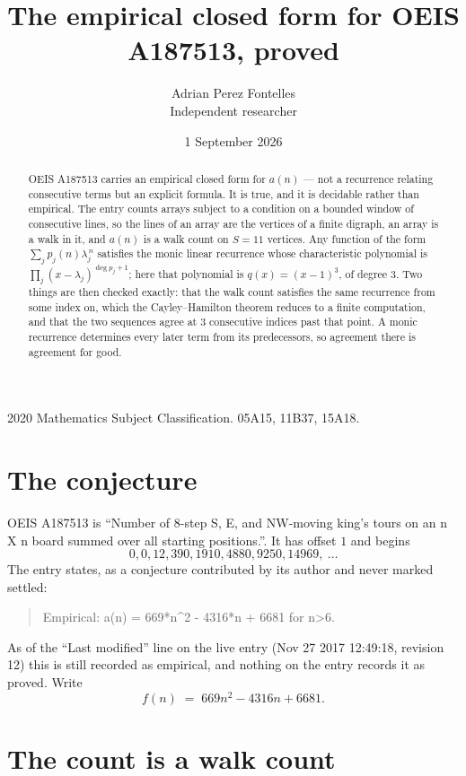 \documentclass[11pt,a4paper]{article}
\title{The empirical closed form for OEIS A187513, proved}
\author{Adrian Perez Fontelles\\ \small Independent researcher}
\date{1 September 2026}
\theoremstyle{plain}
\theoremstyle{definition}
\begin{document}
\maketitle

\begin{abstract}
OEIS A187513 carries an empirical closed form for $a(n)$ --- not a recurrence relating
consecutive terms but an explicit formula. It is true, and it is decidable rather than
empirical. The entry counts arrays subject to a condition on a bounded window of consecutive lines, so the lines of an array are the
vertices of a finite digraph, an array is a walk in it, and $a(n)$ is a walk count on
$S=11$ vertices. Any function of the form $\sum_j p_j(n)\lambda_j^{\,n}$ satisfies the
monic linear recurrence whose characteristic polynomial is
$\prod_j(x-\lambda_j)^{\deg p_j+1}$; here that polynomial is $q(x)=(x-1)^{3}$, of degree
$3$. Two things are then checked exactly: that the walk count satisfies the same
recurrence from some index on, which the Cayley--Hamilton theorem reduces to a finite
computation, and that the two sequences agree at $3$ consecutive indices past that
point. A monic recurrence determines every later term from its predecessors, so agreement
there is agreement for good.
\end{abstract}

\noindent\small 2020 Mathematics Subject Classification. 05A15, 11B37, 15A18.\normalsize

\section{The conjecture}

OEIS A187513 is ``Number of 8-step S, E, and NW-moving king's tours on an n X n board summed over all starting positions.''. It has offset $1$ and begins
\[
0, 0, 12, 390, 1910, 4880, 9250, 14969,\ \dots
\]
The entry states, as a conjecture contributed by its author and never marked settled:
\begin{quote}
Empirical: a(n) = 669*n\^{}2 - 4316*n + 6681 for n>6.
\end{quote}
As of the ``Last modified'' line on the live entry (Nov 27 2017 12:49:18, revision 12) this is still
recorded as empirical, and nothing on the entry records it as proved. Write
\[
f(n)\;=\;669 n^{2} - 4316 n + 6681.
\]

\section{The count is a walk count}
\end{document}
